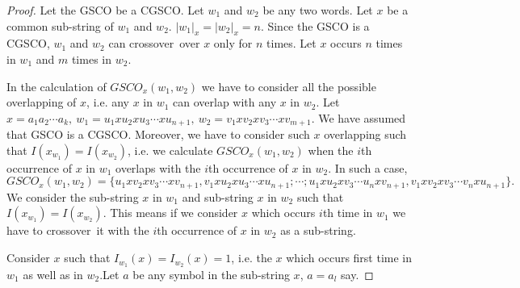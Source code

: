 \documentclass{llncs}
\newcommand{\sae}{crossover~}
\begin{document}
\begin{proof}
Let the GSCO be a CGSCO. Let $w_1$ and $w_2$ be any two words. Let
$x$ be a common sub-string of  $w_1$ and $w_2$. $|w_1|_x=|w_2|_x=n$.
Since the GSCO is a CGSCO, $w_1$ and $w_2$ can \sae over $x$ only
for $n$ times.  Let $x$ occurs $n$ times in $w_1$ and $m$ times in
$w_2$.
\par In the calculation of $GSCO_x(w_1,w_2)$ we have to consider all the possible overlapping of $x$, i.e. any $x$ in $w_1$ can overlap with any $x$ in $w_2$. Let $x=a_1a_2\cdots a_k,~w_1=u_1xu_2xu_3\cdots xu_{n+1},~w_2=v_1xv_2xv_3\cdots xv_{m+1}$. We have assumed that GSCO is a CGSCO. Moreover, we have to consider such $x$ overlapping such that $I(x_{w_1})=I(x_{w_2})$, i.e. we calculate $GSCO_x(w_1,w_2)$ when the $i$th occurrence of $x$ in $w_1$ overlaps with the $i$th occurrence of $x$ in $w_2$.  In such a case,
\begin{equation}\label{m1}
GSCO_x(w_1,w_2)=\{u_1xv_2xv_3\cdots xv_{n+1},v_1xu_2xu_3\cdots
xu_{n+1};
        \cdots;u_1xu_2xv_3\cdots u_n xv_{n+1},v_1xv_2xv_3\cdots v_nxu_{n+1}\}.
\end{equation}
We consider the sub-string $x$ in $w_1$ and sub-string $x$ in $w_2$ such that $I(x_{w_1})=I(x_{w_2})$. This means if we consider $x$ which occurs $i$th time in $w_1$ we have to \sae it with the $i$th occurrence of $x$ in $w_2$ as a sub-string.
\par Consider $x$ such that $I_{w_1}(x)=I_{w_2}(x)=1$, i.e. the $x$ which occurs first time in $w_1$ as well as in $w_2$.Let $a$ be any symbol in the sub-string $x$, $a=a_l$ say.


\end{proof}
\end{document}
